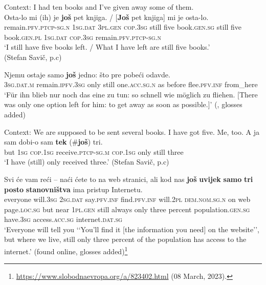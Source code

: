 \begin{exe}
	 \ex Context: I had ten books and I've given away some of them.\label{exappendixBCMSScalar1}\\
	 \gll Osta-lo mi \textup{(}ih\textup{)} je \textbf{još} pet knjiga. / \textup{[}\textbf{Još} pet knjiga\textup{]} mi je osta-lo.\\
	 remain.\textsc{pfv}.\textsc{ptcp}-\textsc{sg}.\textsc{n} 1\textsc{sg}.\textsc{dat} \phantom{(}3\textsc{pl}.\textsc{gen} \textsc{cop}.3\textsc{sg} still five book.\textsc{gen}.\textsc{sg} {} \phantom{[}still five book.\textsc{gen}.\textsc{pl} 1\textsc{sg}.\textsc{dat} \textsc{cop}.3\textsc{sg} remain.\textsc{pfv}.\textsc{ptcp}-\textsc{sg}.\textsc{n}\\
	 \glt \lq I still have five books left. / What I have left are still five books.\rq{}
	 \\(Stefan Savič, p.c)

	 \ex\label{exappendixBCMSScalar2}
	\gll Njemu ostaje samo \textbf{još} jedno: što pre pobeći odavde.\\
	 3\textsc{sg}.\textsc{dat}.\textsc{m} remain.\textsc{ipfv}.3\textsc{sg} only still one.\textsc{acc}.\textsc{sg}.\textsc{n}  as before flee.\textsc{pfv}.\textsc{inf} from\_here\\
	 \glt \lq Für ihn blieb nur noch das eine zu tun: so schnell wie möglich zu fliehen. [There was only one option left for him: to get away as soon as possible.]' (\cite[248]{KontrastiveGrammatik}, glosses added)

  \ex\label{exappendixBCMSScalar3}
	 Context: We are supposed to be sent several books.
	  I have got five.
	  Me, too.
	 \gll A ja sam dobi-o sam \textbf{tek} \textup{(\#{}}\textbf{još}\textup{)} tri.\\
	 but 1\textsc{sg} \textsc{cop}.1\textsc{sg} receive.\textsc{ptcp}-\textsc{sg}.\textsc{m} \textsc{cop}.1\textsc{sg} only \phantom{(\#{}}still three\\
	 \glt \lq I have (still) only received three.\rq{ }(Stefan Savič, p.c)

  \ex\label{exappendixBCMSScalar4}
	\gll Svi će vam reći – naći ćete to na web stranici, ali kod nas \textbf{još} \textbf{uvijek} \textbf{samo} \textbf{tri} \textbf{posto} \textbf{stanovništva} ima pristup Internetu.\\
	everyone will.3\textsc{sg} 2\textsc{sg}.\textsc{dat} say.\textsc{pfv}.\textsc{inf} { } find.\textsc{pfv}.\textsc{inf} will.2\textsc{pl} \textsc{dem}.\textsc{nom}.\textsc{sg}.\textsc{n} on web page.\textsc{loc}.\textsc{sg} but near 1\textsc{pl}.\textsc{gen} still always only three percent population.\textsc{gen}.\textsc{sg} have.3\textsc{sg} access.\textsc{acc}.\textsc{sg} internet.\textsc{dat}.\textsc{sg}\\
	\glt \lq Everyone will tell you \lq\lq{}You’ll find it [the information you need] on the website\rq\rq{}, but where we live, still only three percent of the population has access to the internet.\rq{ }(found online, glosses added)\footnote{\url{https://www.slobodnaevropa.org/a/823402.html} (08 March, 2023).}
	

\end{exe}
